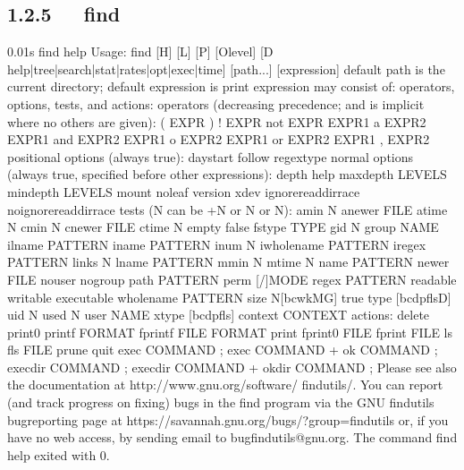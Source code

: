 \documentclass[letterpaper,12pt,english]{sphinxmanual}
\begin{document}
\subsection{1.2.5   find}
\label{\detokenize{001software/001install/linux:find}}
\begin{sphinxVerbatim}[commandchars=\\\{\}]
0.01s\PYGZdl{} find \PYGZhy{}\PYGZhy{}help
Usage: find [\PYGZhy{}H] [\PYGZhy{}L] [\PYGZhy{}P] [\PYGZhy{}Olevel] [\PYGZhy{}D   help|tree|search|stat|rates|opt|exec|time] [path...] [expression]
default path is the current directory; default expression is \PYGZhy{}print
expression may consist of: operators, options, tests, and actions:
operators (decreasing precedence; \PYGZhy{}and is implicit where no others are   given):
      ( EXPR )   ! EXPR   \PYGZhy{}not EXPR   EXPR1 \PYGZhy{}a EXPR2   EXPR1 \PYGZhy{}and EXPR2
      EXPR1 \PYGZhy{}o EXPR2   EXPR1 \PYGZhy{}or EXPR2   EXPR1 , EXPR2
positional options (always true): \PYGZhy{}daystart \PYGZhy{}follow \PYGZhy{}regextype
normal options (always true, specified before other expressions):
      \PYGZhy{}depth \PYGZhy{}\PYGZhy{}help \PYGZhy{}maxdepth LEVELS \PYGZhy{}mindepth LEVELS \PYGZhy{}mount \PYGZhy{}noleaf
      \PYGZhy{}\PYGZhy{}version \PYGZhy{}xdev \PYGZhy{}ignore\PYGZus{}readdir\PYGZus{}race \PYGZhy{}noignore\PYGZus{}readdir\PYGZus{}race
tests (N can be +N or \PYGZhy{}N or N): \PYGZhy{}amin N \PYGZhy{}anewer FILE \PYGZhy{}atime N \PYGZhy{}cmin N
      \PYGZhy{}cnewer FILE \PYGZhy{}ctime N \PYGZhy{}empty \PYGZhy{}false \PYGZhy{}fstype TYPE \PYGZhy{}gid N \PYGZhy{}group NAME
      \PYGZhy{}ilname PATTERN \PYGZhy{}iname PATTERN \PYGZhy{}inum N \PYGZhy{}iwholename PATTERN \PYGZhy{}iregex   PATTERN
      \PYGZhy{}links N \PYGZhy{}lname PATTERN \PYGZhy{}mmin N \PYGZhy{}mtime N \PYGZhy{}name PATTERN \PYGZhy{}newer FILE
      \PYGZhy{}nouser \PYGZhy{}nogroup \PYGZhy{}path PATTERN \PYGZhy{}perm [\PYGZhy{}/]MODE \PYGZhy{}regex PATTERN
      \PYGZhy{}readable \PYGZhy{}writable \PYGZhy{}executable
      \PYGZhy{}wholename PATTERN \PYGZhy{}size N[bcwkMG] \PYGZhy{}true \PYGZhy{}type [bcdpflsD] \PYGZhy{}uid N
      \PYGZhy{}used N \PYGZhy{}user NAME \PYGZhy{}xtype [bcdpfls]
      \PYGZhy{}context CONTEXT
actions: \PYGZhy{}delete \PYGZhy{}print0 \PYGZhy{}printf FORMAT \PYGZhy{}fprintf FILE FORMAT \PYGZhy{}print
      \PYGZhy{}fprint0 FILE \PYGZhy{}fprint FILE \PYGZhy{}ls \PYGZhy{}fls FILE \PYGZhy{}prune \PYGZhy{}quit
      \PYGZhy{}exec COMMAND ; \PYGZhy{}exec COMMAND \PYGZob{}\PYGZcb{} + \PYGZhy{}ok COMMAND ;
      \PYGZhy{}execdir COMMAND ; \PYGZhy{}execdir COMMAND \PYGZob{}\PYGZcb{} + \PYGZhy{}okdir COMMAND ;
Please see also the documentation at http://www.gnu.org/software/  findutils/.
You can report (and track progress on fixing) bugs in the \PYGZdq{}find\PYGZdq{}
program via the GNU findutils bug\PYGZhy{}reporting page at
https://savannah.gnu.org/bugs/?group=findutils or, if
you have no web access, by sending email to \PYGZlt{}bug\PYGZhy{}findutils@gnu.org\PYGZgt{}.
The command \PYGZdq{}find \PYGZhy{}\PYGZhy{}help\PYGZdq{} exited with 0.
\end{sphinxVerbatim}
\end{document}
